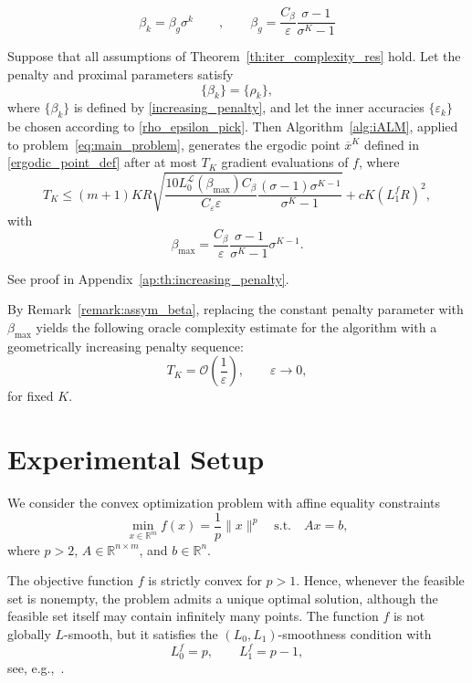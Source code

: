 \documentclass[runningheads]{llncs}
\begin{document}
	\begin{equation}\label{increasing_penalty}
		\boxed{
			\beta_k
			=
			\beta_g\sigma^k
		}
		\quad \quad , \quad \quad 
		\beta_g =
		\frac{C_\beta}{\varepsilon}
		\frac{\sigma-1}{\sigma^K-1}
	\end{equation}
	
	\begin{theorem}\label{th:increasing_penalty}
		Suppose that all assumptions of Theorem~\ref{th:iter_complexity_res} hold. Let the penalty and proximal parameters satisfy
		\[
		\{\beta_k\}=\{\rho_k\},
		\]
		where $\{\beta_k\}$ is defined by \eqref{increasing_penalty}, and let the inner accuracies $\{\varepsilon_k\}$ be chosen according to \eqref{rho_epsilon_pick}. Then Algorithm~\ref{alg:iALM}, applied to problem~\eqref{eq:main_problem}, generates the ergodic point $\overline{x}^K$ defined in \eqref{ergodic_point_def} after at most $T_K$ gradient evaluations of $f$, where
		\[
		T_K
		\le
		(m+1)
		KR
		\sqrt{
			\frac{10L_0^{\mathcal L}(\beta_{\max})C_\beta}
			{C_\varepsilon\varepsilon}
			\frac{(\sigma-1)\sigma^{K-1}}
			{\sigma^K-1}
		}
		+
		cK(L_1^fR)^2,
		\]
		with
		\[
		\beta_{\max}
		=
		\frac{C_\beta}{\varepsilon}
		\frac{\sigma-1}{\sigma^K-1}
		\sigma^{K-1}.
		\]
	\end{theorem}
	
	See proof in Appendix~\ref{ap:th:increasing_penalty}.
	
	By Remark~\ref{remark:assym_beta}, replacing the constant penalty parameter with $\beta_{\max}$ yields the following oracle complexity estimate for the algorithm with a geometrically increasing penalty sequence:
	\[
	T_K
	=
	\mathcal O\!\left(\frac{1}{\varepsilon}\right),
	\qquad
	\varepsilon\to0,
	\]
	for fixed $K$.
	
	\section{Experimental Setup}
	
	We consider the convex optimization problem with affine equality constraints
	$$
	\min_{x\in\mathbb{R}^m} f(x)
	=
	\frac{1}{p}\|x\|^p
	\quad
	\text{s.t.}
	\quad
	Ax=b,
	$$
	where $p>2$, $A\in\mathbb{R}^{n\times m}$, and $b\in\mathbb{R}^n$.
	
	The objective function $f$ is strictly convex for $p>1$. Hence, whenever the feasible set is nonempty, the problem admits a unique optimal solution, although the feasible set itself may contain infinitely many points. The function $f$ is not globally $L$-smooth, but it satisfies the $(L_0,L_1)$-smoothness condition with
	$$
	L_0^f=p,
	\qquad
	L_1^f=p-1,
	$$
	see, e.g.,~\cite{gorbunov2024methods}.
	
\end{document}
